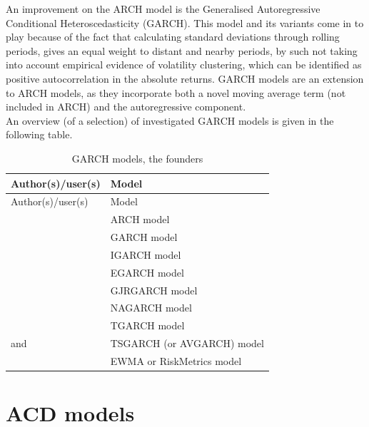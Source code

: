 \documentclass[a4paper, twoside]{templates/ociamthesis}
\begin{document}
\noindent An improvement on the ARCH model is the Generalised Autoregressive Conditional Heteroscedasticity (GARCH). This model and its variants come in to play because of the fact that calculating standard deviations through rolling periods, gives an equal weight to distant and nearby periods, by such not taking into account empirical evidence of volatility clustering, which can be identified as positive autocorrelation in the absolute returns. GARCH models are an extension to ARCH models, as they incorporate both a novel moving average term (not included in ARCH) and the autoregressive component.~\\

An overview (of a selection) of investigated GARCH models is given in the following table.

\begin{longtable}[]{@{}ll@{}}
\caption{GARCH models, the founders}\tabularnewline
\toprule
Author(s)/user(s) & Model\tabularnewline
\midrule
\endfirsthead
\toprule
Author(s)/user(s) & Model\tabularnewline
\midrule
\endhead
\textcite{engle1982} & ARCH model\tabularnewline
\textcite{bollerslev1986} & GARCH model\tabularnewline
\textcite{bollerslev1986} & IGARCH model\tabularnewline
\textcite{nelson1991} & EGARCH model\tabularnewline
\textcite{glosten1993} & GJRGARCH model\tabularnewline
\textcite{engle1993} & NAGARCH model\tabularnewline
\textcite{zakoian1994} & TGARCH model\tabularnewline
\textcite{taylor1986} and \textcite{schwert1989} & TSGARCH (or AVGARCH) model\tabularnewline
\textcite{morganguarantytrustcompany1996} & EWMA or RiskMetrics model\tabularnewline
\bottomrule
\end{longtable}

\hypertarget{acd-models}{%
\section{ACD models}\label{acd-models}}
\end{document}
